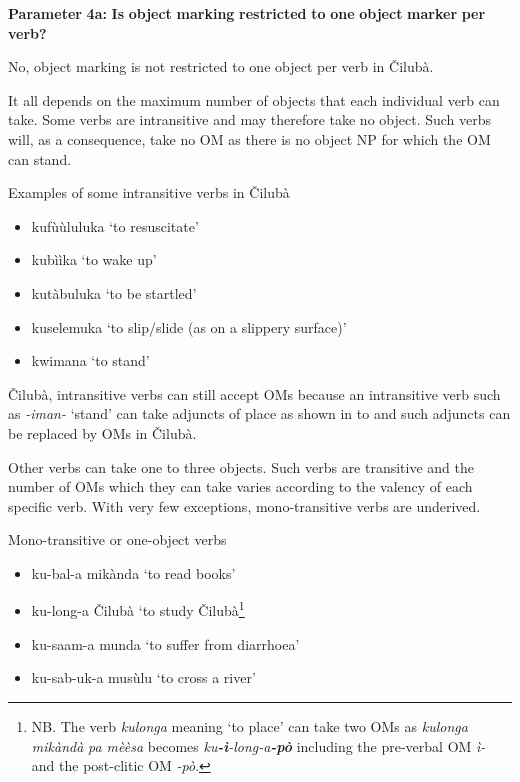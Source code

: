 \documentclass[output=paper]{langscibook}
\begin{document}
\textbf{Parameter} \textbf{4a:} \textbf{Is} \textbf{object} \textbf{marking} \textbf{restricted} \textbf{to} \textbf{one} \textbf{object} \textbf{marker} \textbf{per} \textbf{verb?}

No, object marking is not restricted to one object per verb in Čilubà.

It all depends on the maximum number of objects that each individual verb can take. Some verbs are intransitive and may therefore take no object. Such verbs will, as a consequence, take no OM as there is no object NP for which the OM can stand.

\ea%
    \label{ex:lukusa:26}
    \z

          Examples of some intransitive verbs in Čilubà

\begin{itemize}
\item kufùùluluka    ‘to resuscitate’
\item kubììka        ‘to wake up’
\item kutàbuluka    ‘to be startled’
\item kuselemuka    ‘to slip/slide (as on a slippery surface)’
\item kwimana      ‘to stand’
\end{itemize}

Čilubà, intransitive verbs can still accept OMs because an intransitive verb such as \textit{{}-iman-} ‘stand’ can take adjuncts of place as shown in  to  and such adjuncts can be replaced by OMs in Čilubà.

Other verbs can take one to three objects. Such verbs are transitive and the number of OMs which they can take varies according to the valency of each specific verb. With very few exceptions, mono-transitive verbs are underived.

\ea%
    \label{ex:lukusa:27}
    \z

          Mono-transitive or one-object verbs

\begin{itemize}
\item ku-bal-a mikànda        ‘to read books’
\item ku-long-a Čilubà          ‘to study Čilubà\footnote{NB. The verb \textit{kulonga} meaning ‘to place’ can take two OMs as \textit{kulonga mik}{\textit{à}}\textit{nd}{\textit{à}} \textit{pa m}{\textit{èè}}\textit{sa} becomes \textit{ku}\textbf{\textit{{}-}}{\textbf{\textit{ì}}}\textit{{}-long-a}\textbf{\textit{{}-p}}{\textbf{\textit{ò}}} including the pre-verbal OM {\textit{ì-} and the post-clitic OM \textit{{}-pò}.}}
\item ku-saam-a munda        ‘to suffer from diarrhoea’
\item ku-sab-uk-a musùlu      ‘to cross a river’
\end{itemize}
\end{document}
